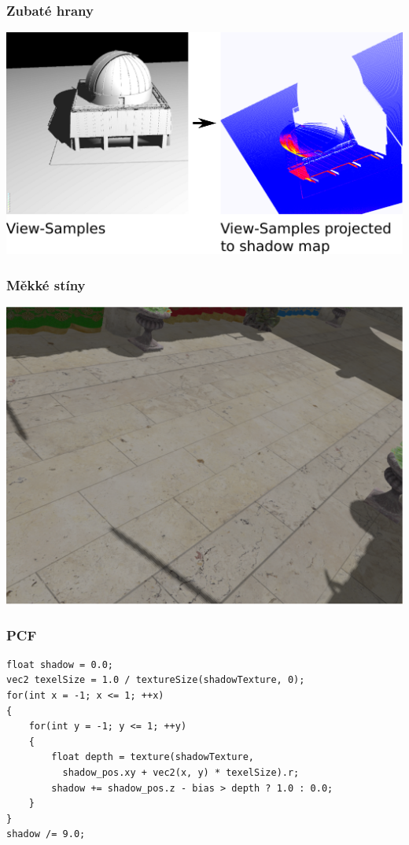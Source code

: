 \begin{frame}
  \frametitle{Zubaté hrany}
  \includegraphics[width=\textwidth]{pics/shadows/shadowMapping/projectedShadowSamples}
\end{frame}

\begin{frame}
    \frametitle{Měkké stíny}
    \includegraphics[width=\textwidth]{pics/shadows/shadowMapping/pcf_nearest.eps}
\end{frame}

\begin{frame}[fragile]
\frametitle{PCF}
{\small
  \begin{verbatim}
float shadow = 0.0;
vec2 texelSize = 1.0 / textureSize(shadowTexture, 0);
for(int x = -1; x <= 1; ++x)
{
    for(int y = -1; y <= 1; ++y)
    {
        float depth = texture(shadowTexture, 
          shadow_pos.xy + vec2(x, y) * texelSize).r; 
        shadow += shadow_pos.z - bias > depth ? 1.0 : 0.0;        
    }    
}
shadow /= 9.0;

  \end{verbatim}
}
\end{frame}


